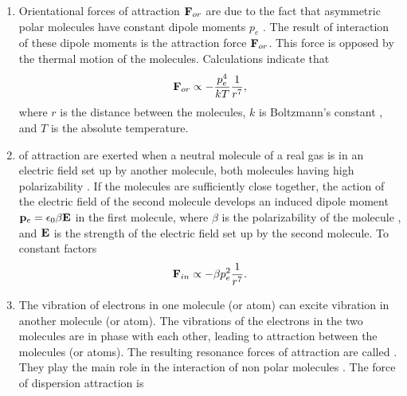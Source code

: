 \begin{enumerate}[label=(\alph*),noitemsep,nolistsep]
\item Orientational forces of attraction $\vb{F}_{or}$ are due to the fact that asymmetric polar molecules  have constant dipole moments $p_{e}$ . The result of interaction of these dipole moments is the attraction force $\vb{F}_{or}$. This force is opposed by the thermal motion of the molecules. Calculations indicate that
\begin{equation*}%
\vb{F}_{or} \propto - \frac{p_{e}^{4}}{kT} \frac{1}{r^{7}},
\end{equation*}
where $r$ is the distance between the molecules, $k$ is Boltzmann's constant , and $T$ is the absolute temperature.
\item {} of attraction are exerted when a neutral molecule of a real gas is in an electric field set up by another molecule, both molecules having high polarizability . If the molecules are sufficiently close together, the action of the electric field of the second molecule develops an induced dipole moment $\vb{p}_{e} = \epsilon_{0} \beta \vb{E}$  in the first molecule, where $\beta$ is the polarizability of the molecule , and $\vb{E}$ is the strength of the electric field set up by the second molecule. To constant factors
\begin{equation*}%
\vb{F}_{in} \propto - \beta p_{e}^{2} \frac{1}{r^{7}}.
\end{equation*}
\item The vibration of electrons in one molecule (or atom) can excite vibration in another molecule (or atom). The vibrations of the electrons in the two molecules are in phase with each other, leading to attraction between the molecules (or atoms). The resulting resonance forces of attraction are called . They play the main role in the interaction of non­ polar molecules . The force of dispersion attraction is

\end{enumerate}
